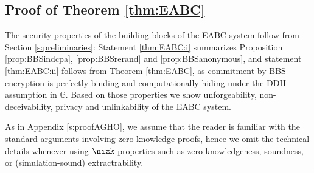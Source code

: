 


\subsection{Proof of Theorem \ref{thm:EABC}}
\label{s:proofEABC}
The security properties of the building blocks of the EABC system follow from Section \ref{s:preliminaries}:
Statement \ref{thm:EABC:i} summarizes Proposition \ref{prop:BBSindcpa}, \ref{prop:BBSrerand} and \ref{prop:BBSanonymous}, and statement \ref{thm:EABC:ii} follows from Theorem \ref{thm:EABC}, as commitment by BBS encryption is perfectly binding and computationally hiding under the DDH assumption in $\mathbb G$.
Based on those properties we show unforgeability, non-deceivability, privacy and unlinkability of the EABC system.

As in Appendix \ref{s:proofAGHO}, we assume that the reader is familiar with the standard arguments involving zero-knowledge proofs, hence we omit the technical details whenever using $\nizk$ properties   such as zero-knowledgeness, soundness, or (simulation-sound) extractrability.


